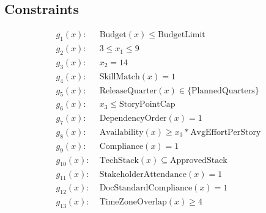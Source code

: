 \documentclass{article}
\begin{document}
\subsection*{Constraints}
\begin{align*}
g_1(x):\;& \text{Budget}(x) \le \text{BudgetLimit}\\
g_2(x):\;& 3 \le x_1 \le 9\\
g_3(x):\;& x_2 = 14\\
g_4(x):\;& \text{SkillMatch}(x) = 1\\
g_5(x):\;& \text{ReleaseQuarter}(x) \in \{\text{PlannedQuarters}\}\\
g_6(x):\;& x_3 \le \text{StoryPointCap}\\
g_7(x):\;& \text{DependencyOrder}(x) = 1\\
g_8(x):\;& \text{Availability}(x) \ge x_3 * \text{AvgEffortPerStory}\\
g_9(x):\;& \text{Compliance}(x) = 1\\
g_{10}(x):\;& \text{TechStack}(x) \subseteq \text{ApprovedStack}\\
g_{11}(x):\;& \text{StakeholderAttendance}(x) = 1\\
g_{12}(x):\;& \text{DocStandardCompliance}(x) = 1\\
g_{13}(x):\;& \text{TimeZoneOverlap}(x) \ge 4
\end{align*}
\end{document}
